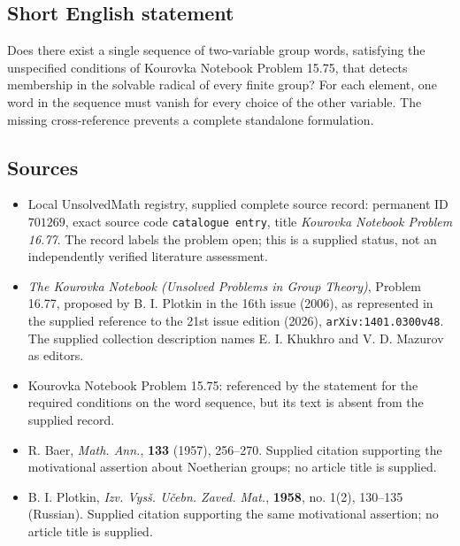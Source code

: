 \documentclass[11pt]{article}
\begin{document}
\subsection{Short English statement}
Does there exist a single sequence of two-variable group words, satisfying the unspecified conditions of Kourovka Notebook Problem 15.75, that detects membership in the solvable radical of every finite group? For each element, one word in the sequence must vanish for every choice of the other variable. The missing cross-reference prevents a complete standalone formulation.
\subsection{Sources}
\begin{itemize}
\item Local UnsolvedMath registry, supplied complete source record: permanent ID \(701269\), exact source code \texttt{catalogue entry}, title \emph{Kourovka Notebook Problem 16.77}. The record labels the problem open; this is a supplied status, not an independently verified literature assessment.
\item \emph{The Kourovka Notebook (Unsolved Problems in Group Theory)}, Problem 16.77, proposed by B. I. Plotkin in the 16th issue (2006), as represented in the supplied reference to the 21st issue edition (2026), \texttt{arXiv:1401.0300v48}. The supplied collection description names E. I. Khukhro and V. D. Mazurov as editors.
\item Kourovka Notebook Problem 15.75: referenced by the statement for the required conditions on the word sequence, but its text is absent from the supplied record.
\item R. Baer, \emph{Math. Ann.}, \textbf{133} (1957), 256--270. Supplied citation supporting the motivational assertion about Noetherian groups; no article title is supplied.
\item B. I. Plotkin, \emph{Izv. Vysš. Učebn. Zaved. Mat.}, \textbf{1958}, no. 1(2), 130--135 (Russian). Supplied citation supporting the same motivational assertion; no article title is supplied.
\end{itemize}
\end{document}
